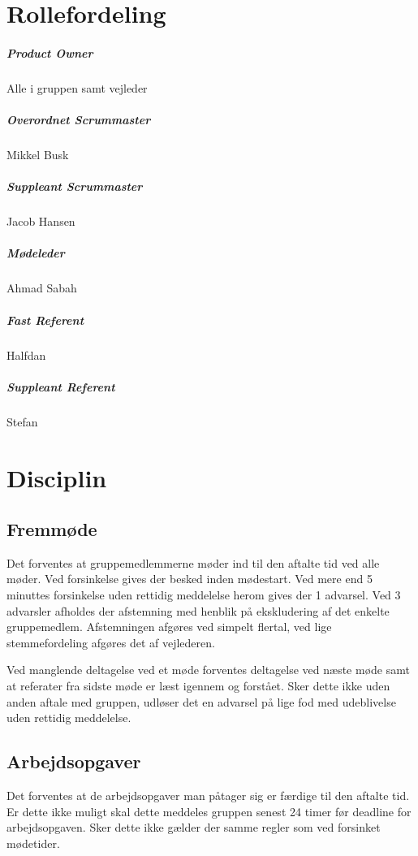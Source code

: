 \documentclass[a4paper,article,11pt,oneside]{memoir}
\begin{document}
\chapter{Rollefordeling}
\paragraph{Product Owner}
Alle i gruppen samt vejleder
\paragraph*{Overordnet Scrummaster} Mikkel Busk
\paragraph*{Suppleant Scrummaster} Jacob Hansen
\paragraph*{Mødeleder}
Ahmad Sabah
\paragraph*{Fast Referent}
Halfdan 
\paragraph*{Suppleant Referent}
Stefan
\chapter{Disciplin}
\section{Fremmøde}
Det forventes at gruppemedlemmerne møder ind til den aftalte tid ved alle møder.
Ved forsinkelse gives der besked inden mødestart.  Ved mere end  5 minuttes forsinkelse uden rettidig meddelelse herom gives der 1 advarsel. Ved 3 advarsler afholdes der afstemning med henblik på ekskludering af det enkelte gruppemedlem. Afstemningen afgøres ved simpelt flertal, ved lige stemmefordeling afgøres det af vejlederen.

Ved manglende deltagelse ved et møde forventes deltagelse ved næste møde samt at referater fra sidste møde er læst igennem og forstået. Sker dette ikke uden anden aftale med gruppen, udløser det en advarsel på lige fod med udeblivelse uden rettidig meddelelse.

\section{Arbejdsopgaver}
Det forventes at de arbejdsopgaver man påtager sig er færdige til den aftalte tid. Er dette ikke muligt skal dette meddeles gruppen senest 24 timer før deadline for arbejdsopgaven. Sker dette ikke gælder der samme regler som ved forsinket mødetider.



\end{document}

